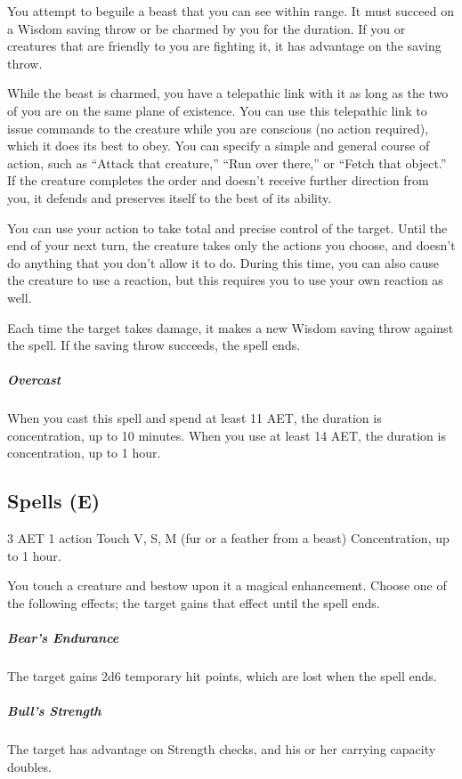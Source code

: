 You attempt to beguile a beast that you can see within range. It must succeed on a Wisdom saving throw or be charmed by you for the duration. If you or creatures that are friendly to you are fighting it, it has advantage on the saving throw.

While the beast is charmed, you have a telepathic link with it as long as the two of you are on the same plane of existence. You can use this telepathic link to issue commands to the creature while you are conscious (no action required), which it does its best to obey. You can specify a simple and general course of action, such as “Attack that creature,” “Run over there,” or “Fetch that object.” If the creature completes the order and doesn't receive further direction from you, it defends and preserves itself to the best of its ability.

You can use your action to take total and precise control of the target. Until the end of your next turn, the creature takes only the actions you choose, and doesn't do anything that you don't allow it to do. During this time, you can also cause the creature to use a reaction, but this requires you to use your own reaction as well.

Each time the target takes damage, it makes a new Wisdom saving throw against the spell. If the saving throw succeeds, the spell ends.

\subparagraph*{Overcast} When you cast this spell and spend at least 11 AET, the duration is concentration, up to 10 minutes. When you use at least 14 AET, the duration is concentration, up to 1 hour.

\subsection{Spells (E)}

{3 AET}
{1 action}
{Touch}
{V, S, M (fur or a feather from a beast)}
{Concentration, up to 1 hour.}

You touch a creature and bestow upon it a magical enhancement. Choose one of the following effects; the target gains that effect until the spell ends.

\subparagraph*{Bear's Endurance} The target gains 2d6 temporary hit points, which are lost when the spell ends.

\subparagraph*{Bull's Strength} The target has advantage on Strength checks, and his or her carrying capacity doubles.

